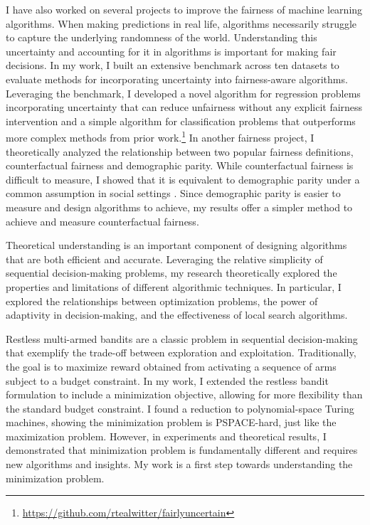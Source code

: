 \documentclass[11pt]{article}
\begin{document}
I have also worked on several projects to improve the fairness of machine learning algorithms.
When making predictions in real life, algorithms necessarily struggle to capture the underlying randomness of the world.
Understanding this uncertainty and accounting for it in algorithms is important for making fair decisions.
In my work, I built an extensive benchmark across ten datasets to evaluate methods for incorporating uncertainty into fairness-aware algorithms.
Leveraging the benchmark, I developed a novel algorithm for regression problems incorporating uncertainty that can reduce unfairness without any explicit fairness intervention and a simple algorithm for classification problems that outperforms more complex methods from prior work.\footnote{\url{https://github.com/rtealwitter/fairlyuncertain}}
In another fairness project, I theoretically analyzed the relationship between two popular fairness definitions, counterfactual fairness and demographic parity.
While counterfactual fairness is difficult to measure, I showed that it is equivalent to demographic parity under a common assumption in social settings \cite{rosenblatt2023counterfactual}.
Since demographic parity is easier to measure and design algorithms to achieve, my results offer a simpler method to achieve and measure counterfactual fairness.


Theoretical understanding is an important component of designing algorithms that are both efficient and accurate.
Leveraging the relative simplicity of sequential decision-making problems, my research theoretically explored the properties and limitations of different algorithmic techniques.
In particular, I explored the relationships between optimization problems, the power of adaptivity in decision-making, and the effectiveness of local search algorithms.

Restless multi-armed bandits are a classic problem in sequential decision-making that exemplify the trade-off between exploration and exploitation.
Traditionally, the goal is to maximize reward obtained from activating a sequence of arms subject to a budget constraint.
In my work, I extended the restless bandit formulation to include a minimization objective, allowing for more flexibility than the standard budget constraint.
I found a reduction to polynomial-space Turing machines, showing the minimization problem is PSPACE-hard, just like the maximization problem.
However, in experiments and theoretical results, I demonstrated that minimization problem is fundamentally different and requires new algorithms and insights.
My work is a first step towards understanding the minimization problem.
\end{document}
